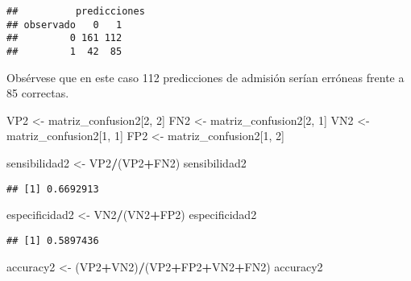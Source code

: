 \documentclass[
]{article}
\newenvironment{Shaded}{\begin{snugshade}}{\end{snugshade}}
\newcommand{\DecValTok}[1]{\textcolor[rgb]{0.00,0.00,0.81}{#1}}
\newcommand{\NormalTok}[1]{#1}
\newcommand{\OtherTok}[1]{\textcolor[rgb]{0.56,0.35,0.01}{#1}}
\newcommand{\SpecialCharTok}[1]{\textcolor[rgb]{0.81,0.36,0.00}{\textbf{#1}}}
\begin{document}
\begin{verbatim}
##          predicciones
## observado   0   1
##         0 161 112
##         1  42  85
\end{verbatim}

Obsérvese que en este caso 112 predicciones de admisión serían erróneas
frente a 85 correctas.

\begin{Shaded}
\begin{Highlighting}[]
\NormalTok{VP2 }\OtherTok{\textless{}{-}}\NormalTok{ matriz\_confusion2[}\DecValTok{2}\NormalTok{, }\DecValTok{2}\NormalTok{]}
\NormalTok{FN2 }\OtherTok{\textless{}{-}}\NormalTok{ matriz\_confusion2[}\DecValTok{2}\NormalTok{, }\DecValTok{1}\NormalTok{]}
\NormalTok{VN2 }\OtherTok{\textless{}{-}}\NormalTok{ matriz\_confusion2[}\DecValTok{1}\NormalTok{, }\DecValTok{1}\NormalTok{]}
\NormalTok{FP2 }\OtherTok{\textless{}{-}}\NormalTok{ matriz\_confusion2[}\DecValTok{1}\NormalTok{, }\DecValTok{2}\NormalTok{]}

\NormalTok{sensibilidad2 }\OtherTok{\textless{}{-}}\NormalTok{ VP2}\SpecialCharTok{/}\NormalTok{(VP2}\SpecialCharTok{+}\NormalTok{FN2)}
\NormalTok{sensibilidad2}
\end{Highlighting}
\end{Shaded}

\begin{verbatim}
## [1] 0.6692913
\end{verbatim}

\begin{Shaded}
\begin{Highlighting}[]
\NormalTok{especificidad2 }\OtherTok{\textless{}{-}}\NormalTok{ VN2}\SpecialCharTok{/}\NormalTok{(VN2}\SpecialCharTok{+}\NormalTok{FP2)}
\NormalTok{especificidad2}
\end{Highlighting}
\end{Shaded}

\begin{verbatim}
## [1] 0.5897436
\end{verbatim}

\begin{Shaded}
\begin{Highlighting}[]
\NormalTok{accuracy2 }\OtherTok{\textless{}{-}}\NormalTok{ (VP2}\SpecialCharTok{+}\NormalTok{VN2)}\SpecialCharTok{/}\NormalTok{(VP2}\SpecialCharTok{+}\NormalTok{FP2}\SpecialCharTok{+}\NormalTok{VN2}\SpecialCharTok{+}\NormalTok{FN2)}
\NormalTok{accuracy2}
\end{Highlighting}
\end{Shaded}
\end{document}
